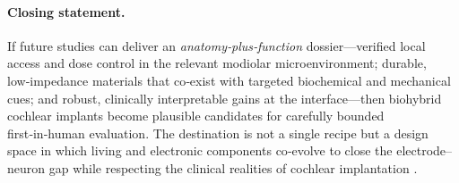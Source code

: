 \documentclass[referee,pdflatex, sn-vancouver-num]{sn-jnl}%
\theoremstyle{thmstyleone}%
\theoremstyle{thmstyletwo}%
\theoremstyle{thmstylethree}%
\begin{document}
\paragraph{Closing statement.}
If future studies can deliver an \emph{anatomy‑plus‑function} dossier—verified local access and dose control in the relevant modiolar microenvironment; durable, low‑impedance materials that co‑exist with targeted biochemical and mechanical cues; and robust, clinically interpretable gains at the interface—then biohybrid cochlear implants become plausible candidates for carefully bounded first‑in‑human evaluation. The destination is not a single recipe but a design space in which living and electronic components co‑evolve to close the electrode–neuron gap while respecting the clinical realities of cochlear implantation \cite{Vecchi2024, CarnicerLombarte2024AdvMat,wilson2008,wilson2014}.


\end{document}
